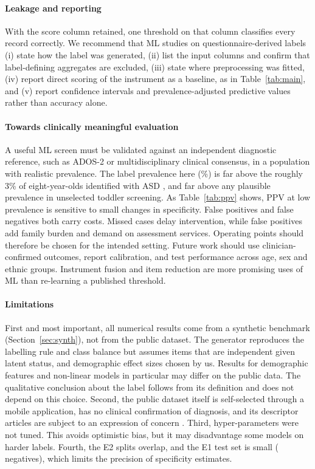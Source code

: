 \documentclass[5p,times,twocolumn]{elsarticle}
\begin{document}
\paragraph{Leakage and reporting}
With the score column retained, one threshold on that column classifies every record correctly. We recommend that ML studies on questionnaire-derived labels (i) state how the label was generated, (ii) list the input columns and confirm that label-defining aggregates are excluded, (iii) state where preprocessing was fitted, (iv) report direct scoring of the instrument as a baseline, as in Table~\ref{tab:main}, and (v) report confidence intervals and prevalence-adjusted predictive values rather than accuracy alone.

\paragraph{Towards clinically meaningful evaluation}
A useful ML screen must be validated against an independent diagnostic reference, such as ADOS-2 or multidisciplinary clinical consensus, in a population with realistic prevalence. The label prevalence here (\PctASD\%) is far above the roughly 3\% of eight-year-olds identified with ASD \cite{shaw2025}, and far above any plausible prevalence in unselected toddler screening. As Table~\ref{tab:ppv} shows, PPV at low prevalence is sensitive to small changes in specificity. False positives and false negatives both carry costs. Missed cases delay intervention, while false positives add family burden and demand on assessment services. Operating points should therefore be chosen for the intended setting. Future work should use clinician-confirmed outcomes, report calibration, and test performance across age, sex and ethnic groups. Instrument fusion \cite{bone2016} and item reduction \cite{wall2012,kosmicki2015} are more promising uses of ML than re-learning a published threshold.

\paragraph{Limitations}
First and most important, all numerical results come from a synthetic benchmark (Section~\ref{sec:synth}), not from the public dataset. The generator reproduces the labelling rule and class balance but assumes items that are independent given latent status, and demographic effect sizes chosen by us. Results for demographic features and non-linear models in particular may differ on the public data. The qualitative conclusion about the label follows from its definition and does not depend on this choice. Second, the public dataset itself is self-selected through a mobile application, has no clinical confirmation of diagnosis, and its descriptor articles are subject to an expression of concern \cite{hijeoc2021}. Third, hyper-parameters were not tuned. This avoids optimistic bias, but it may disadvantage some models on harder labels. Fourth, the E2 splits overlap, and the E1 test set is small (\NTestNeg{} negatives), which limits the precision of specificity estimates.
\end{document}
